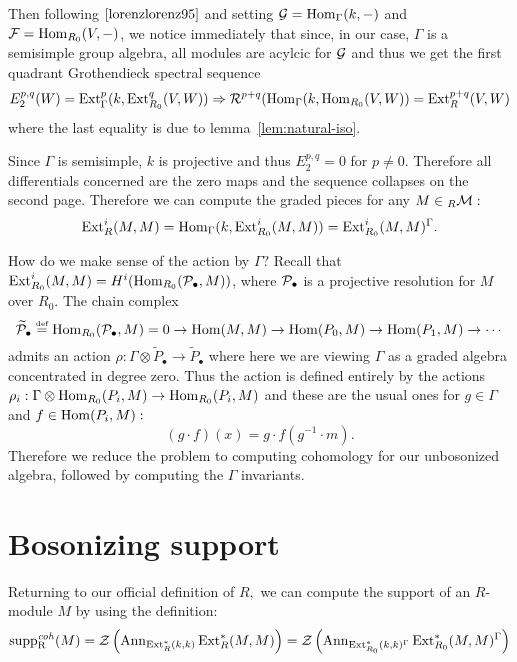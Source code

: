 \documentclass [11pt, proquest] {uwthesis}[2020/02/24]
\DeclareMathOperator{\suppc}{supp^\mathit{coh}_R}
\begin{document}
    Then following $\cite[p.36]{lorenzlorenz95}$ and setting $\mathcal{G}=\operatorname{Hom}_\Gamma(k,-)$ and $\mathcal{F}=\operatorname{Hom}_{R_0}(V,-)$, we notice immediately that since, in our case, $\Gamma$ is a semisimple group algebra, all modules are acylcic for $\mathcal{G}$ and thus we get the first quadrant Grothendieck spectral sequence
    \[E_2^{p,q}(W)=\operatorname{Ext}^p_\Gamma(k,\operatorname{Ext}_{R_0}^q(V,W))\Rightarrow \mathcal{R}^{p+q}(\operatorname{Hom}_\Gamma(k,\operatorname{Hom}_{R_0}(V,W))=\operatorname{Ext}^{p+q}_R(V,W)\]
    where the last equality is due to lemma~\ref{lem:natural-iso}.
    
    Since $\Gamma$ is semisimple, $k$ is projective and thus $E_2^{p,q}=0$ for $p\ne 0.$ Therefore all differentials concerned are the zero maps and the sequence collapses on the second page. Therefore we can compute the graded pieces for any $M\in{_R\mathcal{M}}:$
    \[\operatorname{Ext}_R^i(M,M)=\operatorname{Hom}_\Gamma(k, \operatorname{Ext}^i_{R_0}(M,M))=\operatorname{Ext}^i_{R_0}(M,M)^\Gamma.\]
    
    How do we make sense of the action by $\Gamma?$ Recall that $\operatorname{Ext}^i_{R_0}(M,M)=H^i(\operatorname{Hom}_{R_0}(\mathcal{P}_\bullet,M))$, where $\mathcal{P}_\bullet$ is a projective resolution for $M$ over $R_0.$ The chain complex
    \[\widetilde{\mathcal{P}}_\bullet\stackrel{\text{\tiny def}}{=}\operatorname{Hom}_{R_0}(\mathcal{P}_\bullet,M)=0\to\operatorname{Hom}(M,M)\to \operatorname{Hom}(P_0,M)\to\operatorname{Hom}(P_1,M)\to \cdots\]
    admits an action $\rho:\Gamma\otimes\tilde P_\bullet\to\tilde P_\bullet$ where here we are viewing $\Gamma$ as a graded algebra concentrated in degree zero. Thus the action is defined entirely by the actions $\rho_i:\Gamma\otimes\operatorname{Hom}_{R_0}(P_i,M)\to \operatorname{Hom}_{R_0}(P_i,M)$ and these are the usual ones for $g\in\Gamma$ and $f\in\operatorname{Hom}(P_i,M):$
    \[(g\cdot f)(x)=g\cdot f(g^{-1}\cdot m).\]
    Therefore we reduce the problem to computing cohomology for our unbosonized algebra, followed by computing the $\Gamma$ invariants. 
    
\section{Bosonizing support}
    Returning to our official definition of $R,$ we can compute the support of an $R$-module $M$ by using the definition:
    \[\suppc(M)=\calZ\left(\operatorname{Ann}_{\Ext^\ast_R(k,k)}\Ext_R^\ast(M,M)\right)=\calZ\left(\operatorname{Ann}_{\Ext^\ast_{R_0}(k,k)^\Gamma}\Ext_{R_0}^\ast(M,M)^\Gamma\right)\]
\end{document}
